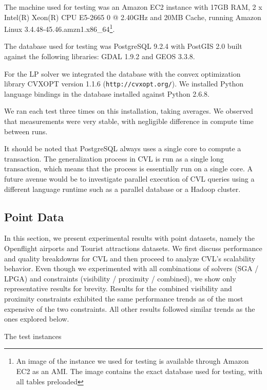 The machine used for testing was an Amazon EC2 instance with 17GB RAM, 2 x Intel(R) Xeon(R) CPU E5-2665 0 @ 2.40GHz and 20MB Cache, running Amazon Linux 3.4.48-45.46.amzn1.x86\_64\footnote{An image of the instance we used for testing is available through Amazon EC2 as an AMI. The image contains the exact database used for testing, with all tables preloaded}.

The database used for testing was PostgreSQL 9.2.4 with PostGIS  2.0 built against the following libraries: GDAL 1.9.2 and GEOS 3.3.8. 

For the LP solver we integrated the database with the convex optimization library CVXOPT version 1.1.6 (\texttt{http://cvxopt.org/}). We installed Python language bindings in the database installed against Python 2.6.8.

We ran each test three times on this installation, taking averages. We observed that measurements were very stable, with negligible difference in compute time between runs.

It should be noted that PostgreSQL always uses a single core to compute a transaction. The generalization process in CVL is run as a single long transaction, which means that the process is essentially run on a single core. A future avenue would be to investigate parallel execution of CVL queries using a different language runtime such as a parallel database or a Hadoop cluster.

\subsection{Point Data}
\label{sec:exp:points}

In this section, we present experimental results with point datasets, namely the Openflight airports and Tourist attractions datasets. We first discuss performance and quality breakdowns for CVL and then proceed to analyze CVL's scalability behavior. Even though we experimented with all combinations of solvers (SGA / LPGA) and constraints (visibility / proximity / combined), we show only representative results for brevity. Results for the combined visibility and proximity constraints exhibited the same performance trends as of the most expensive of the two constraints. All other results followed similar trends as the ones explored below.    

The test instances

